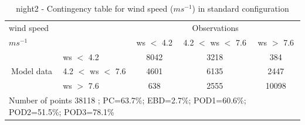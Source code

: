 \begin{table}[h!]
\begin{center}
\begin{tabular}{llccc}
\hline
{wind speed}                                       &                                                    & \multicolumn{3}{c}{Observations}                 \\
{$m s^{-1}$}                                       &                             & ws $<$ 4.2   & 4.2 $<$ ws $<$ 7.6 & ws $>$ 7.6 \\
\hline
\multicolumn{1}{c}{\multirow{3}{*}{Model data}}  & ws $<$ 4.2             & 8042                & 3218                       & 384              \\
                                                 & 4.2  $<$ ws $<$ 7.6 & 4601                & 6135                       & 2447              \\
                                                 & ws $>$ 7.6             & 638                & 2555                       & 10098              \\
\hline 
\multicolumn{5}{l}{ Number of points        38118 ; PC=63.7\%; EBD=2.7\%; POD1=60.6\%; POD2=51.5\%; POD3=78.1\%}                 \\
\end{tabular}
\end{center}
\caption{night2 - Contingency table for {wind speed} ($m s^{-1}$) in standard configuration}
\label{tab:contingencywsBEF:night2}
\end{table}

